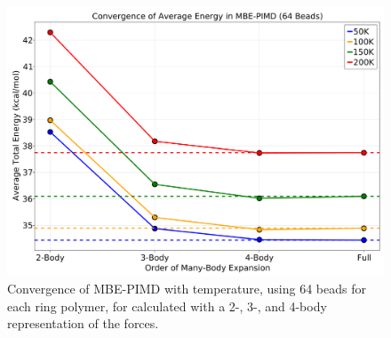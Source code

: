 \begin{figure}[H]
\uwsinglespace
\begin{center}
\begin{minipage}{0.8\textwidth}
\includegraphics[width=\textwidth]{Figures/Chapter_4/ch4_figure_8.png}
\end{minipage}
\end{center}
\caption[Convergence of MBE-PIMD with temperature, using 64 beads for each ring polymer, for  calculated with a 2-, 3-, and 4-body representation of the forces.]{Convergence of MBE-PIMD with temperature, using 64 beads for each ring polymer, for  calculated with a 2-, 3-, and 4-body representation of the forces.}
\label{fig:MBE_MD_F8}
\end{figure}